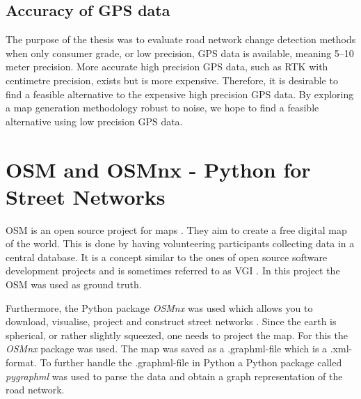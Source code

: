
\subsection{Accuracy of \ac{GPS} data}

The purpose of the thesis was to evaluate road network change detection methods when only consumer grade, or low precision, \ac{GPS} data is available, meaning 5--10 meter precision. More accurate high precision \ac{GPS} data, such as RTK with centimetre precision, exists but is more expensive. Therefore, it is desirable to find a feasible alternative to the expensive high precision \ac{GPS} data. By exploring a map generation methodology robust to noise, we hope to find a feasible alternative using low precision \ac{GPS} data. 

\newpage
\section{OSM and OSMnx - Python for Street Networks}
\label{chp:data.sec:osm}

\ac{OSM} is an open source project for maps \citep{osm}. They aim to create a free digital map of the world. This is done by having volunteering participants collecting data in a central database. It is a concept similar to the ones of open source software development projects and is sometimes referred to as \ac{VGI} \citep{haklay}. In this project the \ac{OSM} was used as ground truth.

Furthermore, the Python package \textit{OSMnx} was used which allows you to download, visualise, project and construct street networks \citep{osmnx}. Since the earth is spherical, or rather slightly squeezed, one needs to project the map. For this the \textit{OSMnx} package was used. The map was saved as a .graphml-file which is a .xml-format. To further handle the .graphml-file in Python a Python package called \textit{pygraphml} was used to parse the data and obtain a graph representation of the road network.

